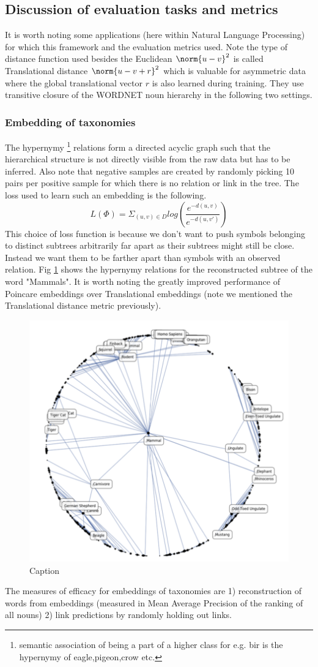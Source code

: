 \subsection{Discussion of evaluation tasks and metrics}
It is worth noting some applications (here within Natural Language Processing) for which this framework and the evaluation metrics used. Note the type of distance function used besides the Euclidean $\norm{u -v}^2$ is called Translational distance $\norm{u-v+r}^2$ which is valuable for asymmetric data where the global translational vector $r$ is also learned during training. They use transitive closure of the WORDNET noun hierarchy in the following two settings.
\subsubsection{Embedding of taxonomies}
The hypernymy \footnote{semantic association of being a part of a higher class for e.g. bir is the hypernymy of eagle,pigeon,crow etc.} relations form a directed acyclic graph such that the hierarchical structure is not directly visible from the raw data but has to be inferred. Also note that negative samples are created by randomly picking 10 pairs per positive sample for which there is no relation or link in the tree. The loss used to learn such an embedding is the following.
$$L(\Phi) = \Sigma_{(u,v)\in D} log (\frac{e^{-d(u,v)}}{e^{-d(u,v')}})$$
This choice of loss function is because we don’t want to push symbols belonging to distinct subtrees arbitrarily far apart as their subtrees might still be close. Instead we want them to be farther apart than symbols with an observed relation. Fig \ref{poincare-embedding} shows the hypernymy relations for the reconstructed subtree of the word "Mammals". It is worth noting the greatly improved performance of Poincare embeddings over Translational embeddings (note we mentioned the Translational distance metric previously).
\begin{figure}
    \centering
    \includegraphics[width=.7\textwidth]{chapter_14/files/poincare-embedding.png}
    \caption{Caption}
    \label{poincare-embedding}
\end{figure}
The measures of efficacy for embeddings of taxonomies are 1) reconstruction of words from embeddings (measured in Mean Average Precision of the ranking of all nouns) 2) link predictions by randomly holding out links.
